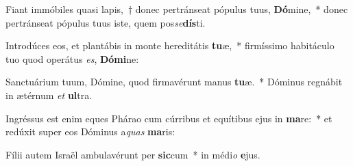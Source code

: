 \item Fiant immóbiles quasi lapis,~† donec pertránseat pópulus tuus, \textbf{Dó}mine,~* donec pertránseat pópulus tuus iste, quem pos\textit{se}\textbf{dís}ti.
\item Introdúces eos, et plantábis in monte hereditátis \textbf{tu}æ,~* firmíssimo habitáculo tuo quod operátus \textit{es}, \textbf{Dó}\textbf{mi}ne:
\item Sanctuárium tuum, Dómine, quod firmavérunt manus \textbf{tu}æ.~* Dóminus regnábit in ætérnum \textit{et} \textbf{ul}tra.
\item Ingréssus est enim eques Phárao cum cúrribus et equítibus ejus in \textbf{ma}re:~* et redúxit super eos Dóminus a\textit{quas} \textbf{ma}ris:
\item Fílii autem Israël ambulavérunt per \textbf{sic}cum~* in médi\textit{o} \textbf{e}jus.
